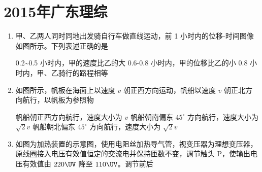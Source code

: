 \documentclass[\gkver]{gaokaozhenti}
\begin{document}
\chapter{2015年广东理综}

\begin{enumerate}
\item
甲、乙两人同时同地出发骑自行车做直线运动，前 1 小时内的位移-时间图像如图所示。下列表述正确的是


{0.2\textasciitilde{}0.5 小时内，甲的速度比乙的大}
{0.6-0.8 小时内，甲的位移比乙的小}
{0.8 小时内，甲、乙骑行的路程相等}


\item
如图所示，帆板在海面上以速度 $v$ 朝正西方向运动，帆船以速度 $v$ 朝正北方向航行，以帆板为参照物


{帆船朝正西方向航行，速度大小为 $v$}
{帆船朝南偏东 $45^{\circ}$ 方向航行，速度大小为 $\sqrt{2}v$}
{帆船朝北偏东 $45^{\circ}$ 方向航行，速度大小为 $\sqrt{2}v$}


\item
如图为加热装置的示意图，使用电阻丝加热导气管，视变压器为理想变压器，原线圈接入电压有效值恒定的交流电并保持匝数不变，调节触头 P，使输出电压有效值由 $220\UV$ 降至 $110\UV$。调节前后


\end{enumerate}
\end{document}
